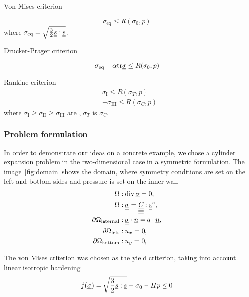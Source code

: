 \documentclass[12pt]{article}
\begin{document}
Von Mises criterion

\begin{equation}
    \sigma_\text{eq} \leq R(\sigma_0, p)
\end{equation}
where $\sigma_\text{eq} = \sqrt{\frac{3}{2}\underline{\underline{s}} : \underline{\underline{s}}}$.

Drucker-Prager criterion

\begin{equation}
    \sigma_\text{eq} + \alpha\mathrm{tr}\underline{\underline{\sigma}} \leq R(\sigma_0, p)
\end{equation}

Rankine criterion
\begin{align}
    & \sigma_\text{I} \leq R(\sigma_T, p) \\
    & -\sigma_\text{III} \leq R(\sigma_C, p)
\end{align}
where $\sigma_\text{I} \geq \sigma_\text{II} \geq \sigma_\text{III}$ are , $\sigma_T$ is $\sigma_C$.

\subsubsection{Problem formulation}

In order to demonstrate our ideas on a concrete example, we chose a cylinder expansion problem in the two-dimensional case in a symmetric formulation. The image~\ref{fig:domain} shows the domain, where symmetry conditions are set on the left and bottom sides and pressure is set on the inner wall
\begin{align}
    \Omega &: \operatorname{div} \underline{\underline{\sigma}} = 0 ,\label{eqn:cylinder_div}\\
    \Omega &: \underline{\underline{\sigma}} = \underline{\underline{\underline{\underline{C_{}}}}} : \underline{\underline{\varepsilon}}^e, \\
    \partial\Omega_\text{internal} &: \underline{\underline{\sigma}} \cdot \underline{n} = q \cdot \underline{n}, \\
    \partial\Omega_\text{left} &: u_x = 0, \\
    \partial\Omega_\text{bottom} &: u_y = 0, \label{eqn:cylinder_bc}
\end{align}

The von Mises criterion was chosen as the yield criterion, taking into account linear isotropic hardening
\begin{equation}
    f(\underline{\underline{\sigma}}) = \sqrt{\frac{3}{2} \underline{\underline{s}} : \underline{\underline{s}}} - \sigma_0 - Hp \leq 0
\end{equation}
\end{document}
